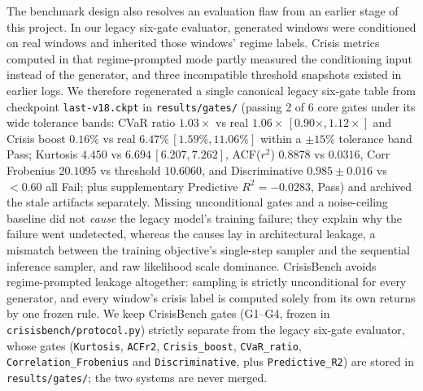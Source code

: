 \documentclass[journal]{IEEEtran}
\begin{document}
The benchmark design also resolves an evaluation flaw from an earlier stage of this project. In our legacy
six-gate evaluator, generated windows were conditioned on real windows and inherited those windows' regime
labels. Crisis metrics computed in that regime-prompted mode partly measured the conditioning input instead
of the generator, and three incompatible threshold snapshots existed in earlier logs. We therefore regenerated
a single canonical legacy six-gate table from checkpoint \texttt{last-v18.ckpt} in
\texttt{results/gates/} (passing 2 of 6 core gates under its wide tolerance bands: CVaR ratio $1.03\times$ vs
real $1.06\times\,[0.90\times, 1.12\times]$ and Crisis boost $0.16\%$ vs real $6.47\%\,[1.59\%, 11.06\%]$ within
a $\pm 15\%$ tolerance band Pass; Kurtosis $4.450$ vs $6.694\,[6.207, 7.262]$, ACF($r^2$) $0.8878$ vs $0.0316$,
Corr Frobenius $20.1095$ vs threshold $10.6060$, and Discriminative $0.985 \pm 0.016$ vs $<0.60$ all Fail; plus
supplementary Predictive $R^2 = -0.0283$, Pass) and archived the stale artifacts separately. Missing
unconditional gates and a noise-ceiling baseline did not \emph{cause} the legacy model's training failure;
they explain why the failure went undetected, whereas the causes lay in architectural
leakage, a mismatch between the training objective's single-step sampler and the sequential inference sampler,
and raw likelihood scale dominance. CrisisBench avoids regime-prompted leakage altogether: sampling is
strictly unconditional for every generator, and every window's crisis label is computed solely from its own
returns by one frozen rule. We keep CrisisBench gates (G1--G4, frozen in \texttt{crisisbench/protocol.py})
strictly separate from the legacy six-gate evaluator, whose gates (\texttt{Kurtosis}, \texttt{ACFr2},
\texttt{Crisis\_boost}, \texttt{CVaR\_ratio}, \texttt{Correlation\_Frobenius} and \texttt{Discriminative},
plus \texttt{Predictive\_R2}) are stored in \texttt{results/gates/}; the two systems are never merged.
\end{document}
